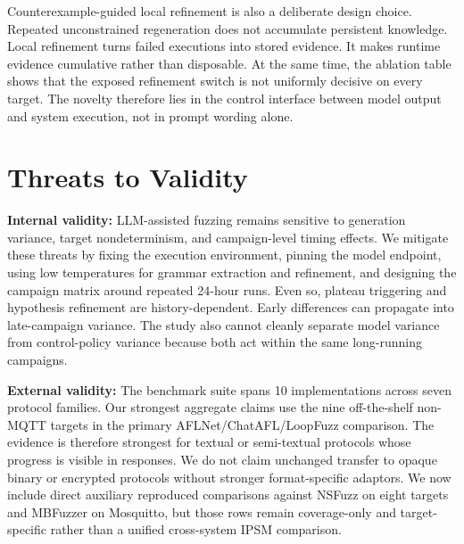 \documentclass[conference]{IEEEtran}
\begin{document}
Counterexample-guided local refinement is also a deliberate design choice. Repeated unconstrained regeneration does not accumulate persistent knowledge. Local refinement turns failed executions into stored evidence. It makes runtime evidence cumulative rather than disposable. At the same time, the ablation table shows that the exposed refinement switch is not uniformly decisive on every target. The novelty therefore lies in the control interface between model output and system execution, not in prompt wording alone.

\section{Threats to Validity}

\textbf{Internal validity:} LLM-assisted fuzzing remains sensitive to generation variance, target nondeterminism, and campaign-level timing effects. We mitigate these threats by fixing the execution environment, pinning the model endpoint, using low temperatures for grammar extraction and refinement, and designing the campaign matrix around repeated 24-hour runs. Even so, plateau triggering and hypothesis refinement are history-dependent. Early differences can propagate into late-campaign variance. The study also cannot cleanly separate model variance from control-policy variance because both act within the same long-running campaigns.

\textbf{External validity:} The benchmark suite spans 10 implementations across seven protocol families. Our strongest aggregate claims use the nine off-the-shelf non-MQTT targets in the primary AFLNet/ChatAFL/LoopFuzz comparison. The evidence is therefore strongest for textual or semi-textual protocols whose progress is visible in responses. We do not claim unchanged transfer to opaque binary or encrypted protocols without stronger format-specific adaptors. We now include direct auxiliary reproduced comparisons against NSFuzz on eight targets and MBFuzzer on Mosquitto, but those rows remain coverage-only and target-specific rather than a unified cross-system IPSM comparison.
\end{document}

